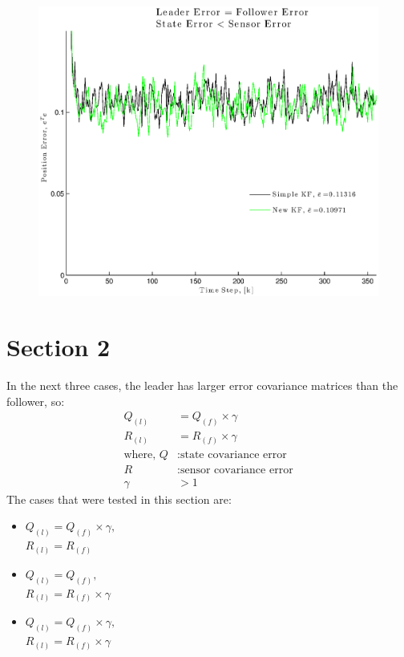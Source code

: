 \documentclass[11pt]{article}
\begin{document}
\begin{figure}[!hbtp]
\centering
\includegraphics[scale=0.7]{fig3}
\end{figure}


\newpage

\section*{Section 2}
In the next three cases, the leader has larger error covariance matrices than the follower, so:
\begin{align*}
Q_{(l)} &= Q_{(f)} \times \gamma \\
R_{(l)} &= R_{(f)} \times \gamma \\
\text{where, } Q &: \text{state covariance error}\\
 R &: \text{sensor covariance error} \\
 \gamma &>1
\end{align*}
The cases that were tested in this section are:
\begin{itemize}
\item $Q_{(l)}=Q_{(f)}\times \gamma,$\\$R_{(l)}=R_{(f)}$
\item $Q_{(l)}=Q_{(f)},$\\ $R_{(l)}=R_{(f)} \times \gamma$
\item $Q_{(l)}=Q_{(f)} \times \gamma,$\\ $R_{(l)}=R_{(f)} \times \gamma$
\end{itemize}
\end{document}
